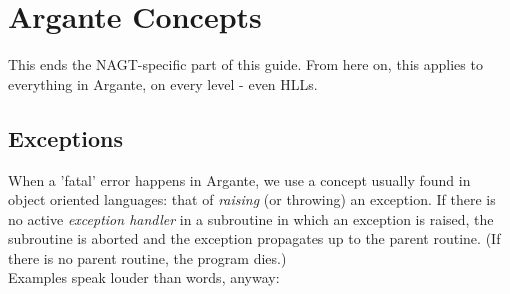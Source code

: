 \documentclass[a4paper,oneside,openany]{book}
\begin{document}
\section{Argante Concepts}
This ends the NAGT-specific part of this guide. From here on, this applies to
everything in Argante, on every level - even HLLs.
\subsection{Exceptions}
When a 'fatal' error happens in Argante, we use a concept usually found
in object oriented languages: that of \emph{raising} (or throwing) an exception.
If there is no active \emph{exception handler} in a subroutine in which an
exception is raised, the subroutine is aborted and the exception propagates up
to the parent routine. (If there is no parent routine, the program dies.)\\
Examples speak louder than words, anyway:
\end{document}
